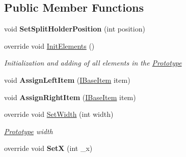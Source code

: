 \subsection*{Public Member Functions}
\begin{DoxyCompactItemize}
\item 
\mbox{\label{class_space_v_i_l_1_1_vertical_split_area_a8aa51b2b1d21e1a0d788a21e9027ca4f}} 
void {\bfseries Set\+Split\+Holder\+Position} (int position)
\item 
override void \mbox{\hyperlink{class_space_v_i_l_1_1_vertical_split_area_ac00bf6f3d89b83dadcdd05f6e95b97d8}{Init\+Elements}} ()
\begin{DoxyCompactList}\small\item\em Initialization and adding of all elements in the \mbox{\hyperlink{class_space_v_i_l_1_1_prototype}{Prototype}} \end{DoxyCompactList}\item 
\mbox{\label{class_space_v_i_l_1_1_vertical_split_area_a2b226695a4f66447246db5923f3465b3}} 
void {\bfseries Assign\+Left\+Item} (\mbox{\hyperlink{interface_space_v_i_l_1_1_core_1_1_i_base_item}{I\+Base\+Item}} item)
\item 
\mbox{\label{class_space_v_i_l_1_1_vertical_split_area_a3cc27337a3ec6eb3c25e9420fac2eef1}} 
void {\bfseries Assign\+Right\+Item} (\mbox{\hyperlink{interface_space_v_i_l_1_1_core_1_1_i_base_item}{I\+Base\+Item}} item)
\item 
override void \mbox{\hyperlink{class_space_v_i_l_1_1_vertical_split_area_a665c01c8beced7686b57b7f4d41f3b70}{Set\+Width}} (int width)
\begin{DoxyCompactList}\small\item\em \mbox{\hyperlink{class_space_v_i_l_1_1_prototype}{Prototype}} width \end{DoxyCompactList}\item 
\mbox{\label{class_space_v_i_l_1_1_vertical_split_area_a6598a90a036bc0831c0678175d0f4256}} 
override void {\bfseries SetX} (int \+\_\+x)
\item 
\mbox{\label{class_space_v_i_l_1_1_vertical_split_area_a5d58eeccf50eedca1ff09add7eed51c9}} 

\end{DoxyCompactItemize}
